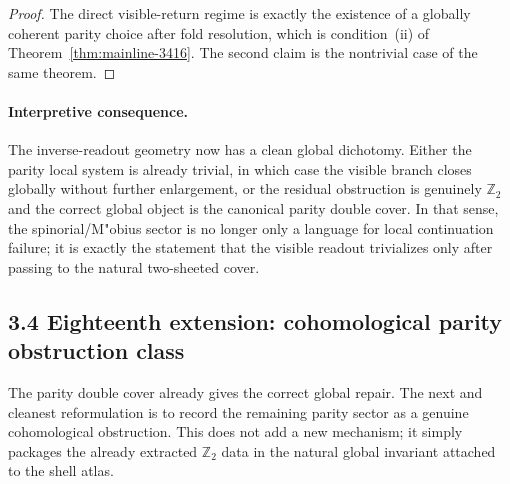 \documentclass[12pt,a4paper]{article}
\begin{document}
\begin{proof}
The direct visible-return regime is exactly the existence of a globally coherent parity choice after fold resolution, which is condition~(ii) of Theorem~\ref{thm:mainline-3416}. The second claim is the nontrivial case of the same theorem.
\end{proof}

\paragraph{Interpretive consequence.}
The inverse-readout geometry now has a clean global dichotomy. Either the parity local system is already trivial, in which case the visible branch closes globally without further enlargement, or the residual obstruction is genuinely $\mathbb Z_2$ and the correct global object is the canonical parity double cover. In that sense, the spinorial/M"obius sector is no longer only a language for local continuation failure; it is exactly the statement that the visible readout trivializes only after passing to the natural two-sheeted cover.


\subsection*{3.4 Eighteenth extension: cohomological parity obstruction class}
The parity double cover already gives the correct global repair. The next and cleanest reformulation is to record the remaining parity sector as a genuine cohomological obstruction. This does not add a new mechanism; it simply packages the already extracted $\mathbb Z_2$ data in the natural global invariant attached to the shell atlas.
\end{document}
